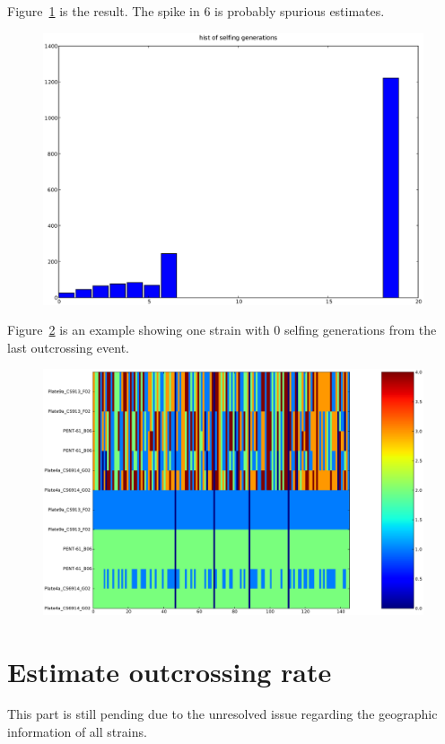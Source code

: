 \documentclass[a4paper,10pt]{article}
\begin{document}
Figure~\ref{f8} is the result. The spike in 6 is probably spurious estimates.

\begin{figure}
\includegraphics[width=1\textwidth]{figures/justin_data_y_b_filtered.estimate.selfing.generation.hist.eps}
\caption{}\label{f8}
\end{figure}

Figure~\ref{f9} is an example showing one strain with 0 selfing generations from the last outcrossing event.

\begin{figure}
\includegraphics[width=1\textwidth]{figures/trio1.eps}
\caption{}\label{f9}
\end{figure}

\section{Estimate outcrossing rate}
This part is still pending due to the unresolved issue regarding the geographic information of all strains.



\end{document}
